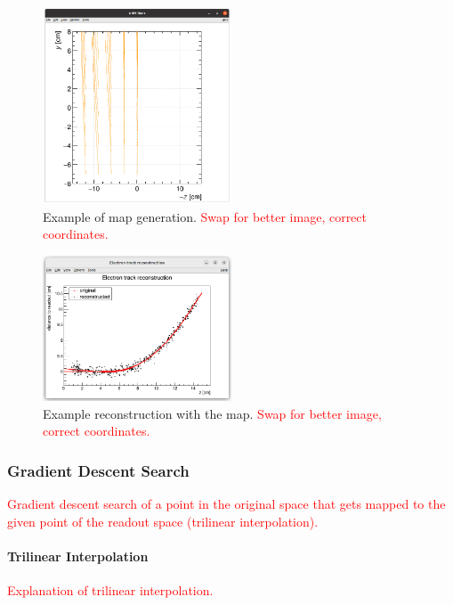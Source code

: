 \documentclass[]{article}
\begin{document}
			\begin{figure}
				\centering
				\includegraphics[width=0.5\textwidth]{map_9010_gen.png}
				\caption{Example of map generation. \textcolor{red}{Swap for better image, correct coordinates.}}
				\label{fig:map9010gen}
			\end{figure}
			
			\begin{figure}
				\centering
				\includegraphics[width=0.5\textwidth]{9010_reco.png}
				\caption{Example reconstruction with the map. \textcolor{red}{Swap for better image, correct coordinates.}}
				\label{fig:9010reco}
			\end{figure}
			
			\subsubsection{Gradient Descent Search}
				\textcolor{red}{Gradient descent search of a point in the original space that gets mapped to the given point of the readout space (trilinear interpolation).}
			
				\paragraph{Trilinear Interpolation}
					\textcolor{red}{\newline Explanation of trilinear interpolation.}
					
\end{document}
